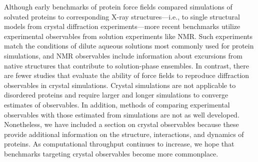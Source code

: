 \documentclass[9pt,review,pubversion]{livecoms}
\begin{document}
Although early benchmarks of protein force fields compared simulations of solvated proteins to corresponding X-ray structures---i.e., to single structural models from crystal diffraction experiments---more recent benchmarks utilize experimental observables from solution experiments like NMR.
Such experiments match the conditions of dilute aqueous solutions most commonly used for protein simulations, and NMR observables include information about excursions from native structures that contribute to solution-phase ensembles. 
In contrast, there are fewer studies that evaluate the ability of force fields to reproduce diffraction observables in crystal simulations.
Crystal simulations are not applicable to disordered proteins and require larger and longer simulations to converge estimates of observables. In addition, methods of comparing experimental observables with those estimated from simulations are not as well developed.
Nonetheless, we have included a section on crystal observables because these provide additional information on the structure, interactions, and dynamics of proteins.
As computational throughput continues to increase, we hope that benchmarks targeting crystal observables become more commonplace.
\end{document}
